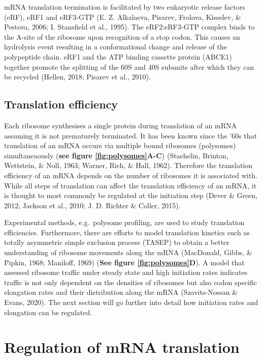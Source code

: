 \documentclass[12pt,openany]{book}
\begin{document}
mRNA translation termination is facilitated by two eukaryotic release
factors (eRF), eRF1 and eRF3-GTP (E. Z. Alkalaeva, Pisarev, Frolova,
Kisselev, \& Pestova, 2006; I. Stansfield et al., 1995). The
eRF2:eRF3-GTP complex binds to the A-site of the ribosome upon
recognition of a stop codon. This causes an hydrolysis event resulting
in a conformational change and release of the polypeptide chain. eRF1
and the ATP binding cassette protein (ABCE1) together promote the
splitting of the 60S and 40S subunits after which they can be recycled
(Hellen, 2018; Pisarev et al., 2010).

\subsection{Translation efficiency}

Each ribosome synthesises a single protein during translation of an mRNA
assuming it is not prematurely terminated. It has been known since the
'60s that translation of an mRNA occurs via multiple bound ribosomes
(polysomes) simultaneaously (\textbf{see figure \ref{fig:polysomes}A-C})
(Staehelin, Brinton, Wettstein, \& Noll, 1963; Warner, Rich, \& Hall,
1962). Therefore the translation efficiency of an mRNA depends on the
number of ribosomes it is associated with. While all steps of
translation can affect the translation efficiency of an mRNA, it is
thought to most commonly be regulated at the initiation step (Dever \&
Green, 2012; Jackson et al., 2010; J. D. Richter \& Coller, 2015).

Experimental methods, e.g.~polysome profiling, are used to study
translation efficiencies. Furthermore, there are efforts to model
translation kinetics such as totally asymmetric simple exclusion process
(TASEP) to obtain a better understanding of ribosome movements along the
mRNA (MacDonald, Gibbs, \& Pipkin, 1968; Maniloff, 1969) (\textbf{See
figure \ref{fig:polysomes}D}). A model that assessed ribosome traffic
under steady state and high initiation rates indicates traffic is not
only dependent on the densities of ribosomes but also codon specific
elongation rates and their distribution along the mRNA (Szavits-Nossan
\& Evans, 2020). The next section will go further into detail how
initiation rates and elongation can be regulated. \newline
\section{Regulation of mRNA translation} \label{regmRNA}
\end{document}
